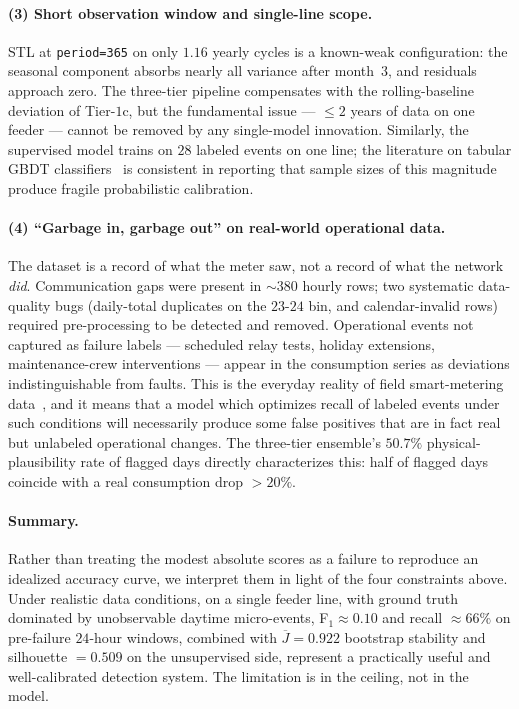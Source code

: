 \documentclass{article}
\begin{document}
\paragraph{(3) Short observation window and single-line scope.}
STL at \texttt{period=365} on only $1.16$ yearly cycles is a known-weak configuration: the seasonal component absorbs nearly all variance after month~$3$, and residuals approach zero. The three-tier pipeline compensates with the rolling-baseline deviation of Tier-$1$c, but the fundamental issue --- $\leq 2$ years of data on one feeder --- cannot be removed by any single-model innovation. Similarly, the supervised model trains on $28$ labeled events on one line; the literature on tabular GBDT classifiers~\cite{shwartz2022tabular,chen2016xgboost} is consistent in reporting that sample sizes of this magnitude produce fragile probabilistic calibration.

\paragraph{(4) ``Garbage in, garbage out'' on real-world operational data.}
The dataset is a record of what the meter saw, not a record of what the network \emph{did}. Communication gaps were present in $\sim 380$ hourly rows; two systematic data-quality bugs (daily-total duplicates on the $23$-$24$ bin, and calendar-invalid rows) required pre-processing to be detected and removed. Operational events not captured as failure labels --- scheduled relay tests, holiday extensions, maintenance-crew interventions --- appear in the consumption series as deviations indistinguishable from faults. This is the everyday reality of field smart-metering data~\cite{himeur2021survey}, and it means that a model which optimizes recall of labeled events under such conditions will necessarily produce some false positives that are in fact real but unlabeled operational changes. The three-tier ensemble's $50.7\%$ physical-plausibility rate of flagged days directly characterizes this: half of flagged days coincide with a real consumption drop $>20\%$.

\paragraph{Summary.}
Rather than treating the modest absolute scores as a failure to reproduce an idealized accuracy curve, we interpret them in light of the four constraints above. Under realistic data conditions, on a single feeder line, with ground truth dominated by unobservable daytime micro-events, F$_1 \approx 0.10$ and recall $\approx 66\%$ on pre-failure $24$-hour windows, combined with $\overline{J}=0.922$ bootstrap stability and silhouette $=0.509$ on the unsupervised side, represent a practically useful and well-calibrated detection system. The limitation is in the ceiling, not in the model.
\end{document}
